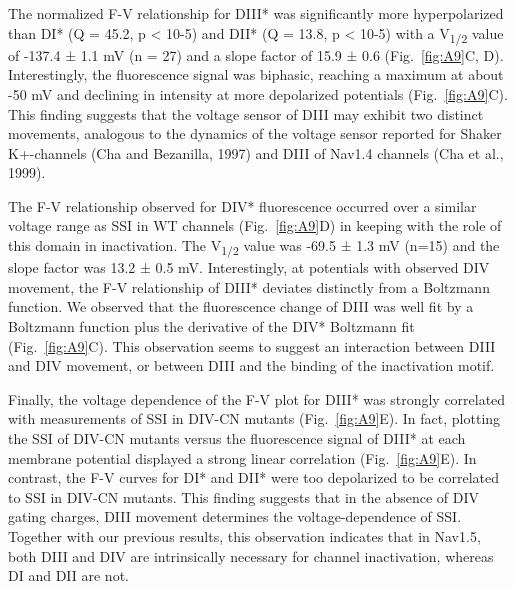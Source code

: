 The normalized F-V relationship for DIII* was significantly more hyperpolarized than DI* (Q = 45.2, p < 10-5) and DII* (Q = 13.8, p < 10-5) with a V\textsubscript{1/2} value of -137.4 ± 1.1 mV (n = 27) and a slope factor of 15.9 ± 0.6 (Fig.~\ref{fig:A9}C, D). Interestingly, the fluorescence signal was biphasic, reaching a maximum at about -50 mV and declining in intensity at more depolarized potentials (Fig.~\ref{fig:A9}C). This finding suggests that the voltage sensor of DIII may exhibit two distinct movements, analogous to the dynamics of the voltage sensor reported for Shaker K+-channels (Cha and Bezanilla, 1997) and DIII of Nav1.4 channels (Cha et al., 1999).

The F-V relationship observed for DIV* fluorescence occurred over a similar voltage range as SSI in WT channels (Fig.~\ref{fig:A9}D) in keeping with the role of this domain in inactivation. The V\textsubscript{1/2} value was -69.5 ± 1.3 mV (n=15) and the slope factor was 13.2 ± 0.5 mV. Interestingly, at potentials with observed DIV movement, the F-V relationship of DIII* deviates distinctly from a Boltzmann function. We observed that the fluorescence change of DIII was well fit by a Boltzmann function plus the derivative of the DIV* Boltzmann fit (Fig.~\ref{fig:A9}C). This observation seems to suggest an interaction between DIII and DIV movement, or between DIII and the binding of the inactivation motif. 

Finally, the voltage dependence of the F-V plot for DIII* was strongly correlated with measurements of SSI in DIV-CN mutants (Fig.~\ref{fig:A9}E). In fact, plotting the SSI of DIV-CN mutants versus the fluorescence signal of DIII* at each membrane potential displayed a strong linear correlation (Fig.~\ref{fig:A9}E). In contrast, the F-V curves for DI* and DII* were too depolarized to be correlated to SSI in DIV-CN mutants. This finding suggests that in the absence of DIV gating charges, DIII movement determines the voltage-dependence of SSI. Together with our previous results, this observation indicates that in Nav1.5, both DIII and DIV are intrinsically necessary for channel inactivation, whereas DI and DII are not.

